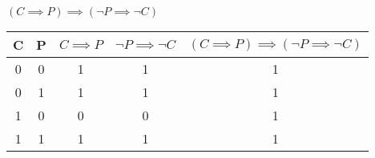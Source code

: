 \documentclass{article}
\begin{document}
\section{}
$(C \implies P) \implies (\neg P \implies \neg C)$

\begin{tabular}{c|c|c|c|c}
	C & P & $C \implies P$ & $\neg P \implies \neg C$ &  $(C \implies P) \implies (\neg P \implies \neg C) $\\
	\hline    
	0 & 0 & 1 & 1 & 1\\
	0 & 1 & 1 & 1 & 1\\
	1 & 0 & 0 & 0 & 1\\
	1 & 1 & 1 & 1 & 1
\end{tabular}

\section{}
\end{document}
